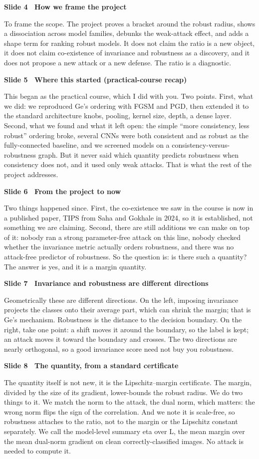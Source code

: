\documentclass[11pt]{article}
\newcommand{\slide}[3]{%
  \par\vspace{0.9em}%
  {\color{TUMblue}\bfseries Slide #1 \textbullet\ #2}\par
  \vspace{0.25em}#3\par}
\begin{document}
\slide{4}{How we frame the project}{%
To frame the scope. The project proves a bracket around the robust radius, shows a dissociation
across model families, debunks the weak-attack effect, and adds a shape term for ranking robust
models. It does not claim the ratio is a new object, it does not claim co-existence of invariance and
robustness as a discovery, and it does not propose a new attack or a new defense. The ratio is a
diagnostic.}

\slide{5}{Where this started (practical-course recap)}{%
This began as the practical course, which I did with you. Two points. First, what we did: we
reproduced Ge's ordering with FGSM and PGD, then extended it to the standard architecture knobs,
pooling, kernel size, depth, a dense layer. Second, what we found and what it left open: the simple
``more consistency, less robust'' ordering broke, several CNNs were both consistent and as robust as
the fully-connected baseline, and we screened models on a consistency-versus-robustness graph. But it
never said which quantity predicts robustness when consistency does not, and it used only weak
attacks. That is what the rest of the project addresses.}

\slide{6}{From the project to now}{%
Two things happened since. First, the co-existence we saw in the course is now in a published paper,
TIPS from Saha and Gokhale in 2024, so it is established, not something we are claiming. Second, there
are still additions we can make on top of it: nobody ran a strong parameter-free attack on this line,
nobody checked whether the invariance metric actually orders robustness, and there was no attack-free
predictor of robustness. So the question is: is there such a quantity? The answer is yes, and it is a
margin quantity.}

\slide{7}{Invariance and robustness are different directions}{%
Geometrically these are different directions. On the left, imposing invariance projects the classes
onto their average part, which can shrink the margin; that is Ge's mechanism. Robustness is the
distance to the decision boundary. On the right, take one point: a shift moves it around the boundary,
so the label is kept; an attack moves it toward the boundary and crosses. The two directions are
nearly orthogonal, so a good invariance score need not buy you robustness.}

\slide{8}{The quantity, from a standard certificate}{%
The quantity itself is not new, it is the Lipschitz--margin certificate. The margin, divided by the
size of its gradient, lower-bounds the robust radius. We do two things to it. We match the norm to the
attack, the dual norm, which matters: the wrong norm flips the sign of the correlation. And we note it
is scale-free, so robustness attaches to the ratio, not to the margin or the Lipschitz constant
separately. We call the model-level summary eta over L, the mean margin over the mean dual-norm
gradient on clean correctly-classified images. No attack is needed to compute it.}
\end{document}
